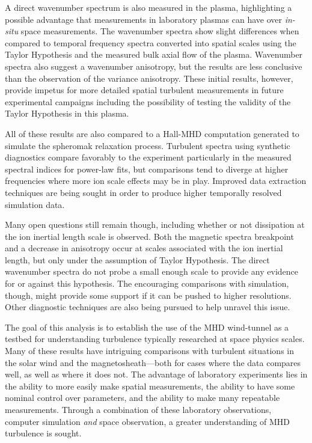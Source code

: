 \documentclass[manuscript]{aastex}
\begin{document}
A direct wavenumber spectrum is also measured in the plasma, highlighting a possible advantage that measurements in laboratory plasmas can have over {\it in-situ} space measurements. The wavenumber spectra show slight differences when compared to temporal frequency spectra converted into spatial scales using the Taylor Hypothesis and the measured bulk axial flow of the plasma. Wavenumber spectra also suggest a wavenumber anisotropy, but the results are less conclusive than the observation of the variance anisotropy. These initial results, however, provide impetus for more detailed spatial turbulent measurements in future experimental campaigns including the possibility of testing the validity of the Taylor Hypothesis in this plasma.

All of these results are also compared to a Hall-MHD computation generated to simulate the spheromak relaxation process. Turbulent spectra using synthetic diagnostics compare favorably to the experiment particularly in the measured spectral indices for power-law fits, but comparisons tend to diverge at higher frequencies where more ion scale effects may be in play. Improved data extraction techniques are being sought in order to produce higher temporally resolved simulation data.

Many open questions still remain though, including whether or not dissipation at the ion inertial length scale is observed. Both the magnetic spectra breakpoint and a decrease in anisotropy occur at scales associated with the ion inertial length, but only under the assumption of Taylor Hypothesis. The direct wavenumber spectra do not probe a small enough scale to provide any evidence for or against this hypothesis. The encouraging comparisons with simulation, though, might provide some support if it can be pushed to higher resolutions. Other diagnostic techniques are also being pursued to help unravel this issue.

The goal of this analysis is to establish the use of the MHD wind-tunnel as a testbed for understanding turbulence typically researched at space physics scales. Many of these results have intriguing comparisons with turbulent situations in the solar wind and the magnetosheath---both for cases where the data compares well, as well as where it does not. The advantage of laboratory experiments lies in the ability to more easily make spatial measurements, the ability to have some nominal control over parameters, and the ability to make many repeatable measurements. Through a combination of these laboratory observations, computer simulation {\it and} space observation, a greater understanding of MHD turbulence is sought.
\end{document}
